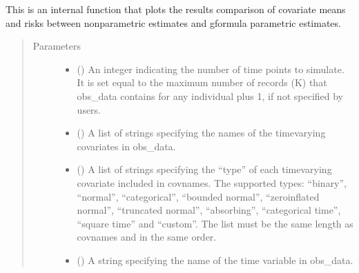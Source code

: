 \documentclass[letterpaper,10pt,english]{sphinxmanual}
\begin{document}
\begin{fulllineitems}
\label{\detokenize{Specifications/Output:pygformula.plot.plot_natural_course}}
\sphinxAtStartPar
This is an internal function that plots the results comparison of covariate means and risks between non\sphinxhyphen{}parametric
estimates and g\sphinxhyphen{}formula parametric estimates.
\begin{quote}\begin{description}
\item[{Parameters}] \leavevmode\begin{itemize}
\item {} 
\sphinxAtStartPar
{} () \textendash{} An integer indicating the number of time points to simulate. It is set equal to the maximum number of records (K)
that obs\_data contains for any individual plus 1, if not specified by users.

\item {} 
\sphinxAtStartPar
{} () \textendash{} A list of strings specifying the names of the time\sphinxhyphen{}varying covariates in obs\_data.

\item {} 
\sphinxAtStartPar
{} () \textendash{} A list of strings specifying the “type” of each time\sphinxhyphen{}varying covariate included in covnames.
The supported types: “binary”, “normal”, “categorical”, “bounded normal”, “zero\sphinxhyphen{}inflated normal”,
“truncated normal”, “absorbing”, “categorical time”, “square time” and “custom”. The list must be the same length
as covnames and in the same order.

\item {} 
\sphinxAtStartPar
{} () \textendash{} A string specifying the name of the time variable in obs\_data.


\end{itemize}
\end{description}
\end{quote}
\end{fulllineitems}
\end{document}
